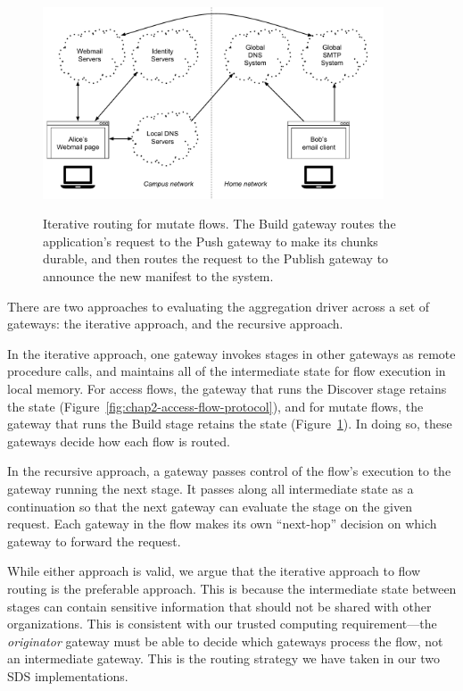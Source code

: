 \begin{figure}[h]
   \caption{Iterative routing for mutate flows.  The Build gateway routes the
   application's request to the Push gateway to make its chunks durable, and
   then routes the request to the Publish gateway to announce the new manifest
   to the system.}
   \centering
   \includegraphics[width=0.9\textwidth,page=10]{figures/dissertation-figures}
   \label{fig:chap2-mutate-flow-protocol}
\end{figure}

There are two approaches to evaluating the aggregation driver across a set of
gateways:  the iterative approach, and the recursive approach.

In the iterative approach, one gateway invokes stages in other gateways as
remote procedure calls, and maintains all of the intermediate state for flow
execution in local memory.  For access flows, the gateway that runs the Discover
stage retains the state (Figure~\ref{fig:chap2-access-flow-protocol}), and for
mutate flows, the gateway that runs the Build stage retains the state
(Figure~\ref{fig:chap2-mutate-flow-protocol}).  In doing so, these gateways
decide how each flow is routed.

In the recursive approach, a gateway passes control of the flow's execution
to the gateway running the next stage.  It passes along all intermediate
state as a continuation so that the next gateway can evaluate the stage on the
given request.  Each gateway in the flow makes its own
``next-hop'' decision on which gateway to forward the request.

While either approach is valid, we argue that the iterative approach to flow
routing is the preferable approach.  This is because the intermediate state between
stages can contain sensitive information that should not be shared with other
organizations.  This is consistent with our trusted computing requirement---the
\emph{originator} gateway must be able
to decide which gateways process the flow, not an intermediate gateway.
This is the routing strategy we have taken in our two SDS
implementations.

